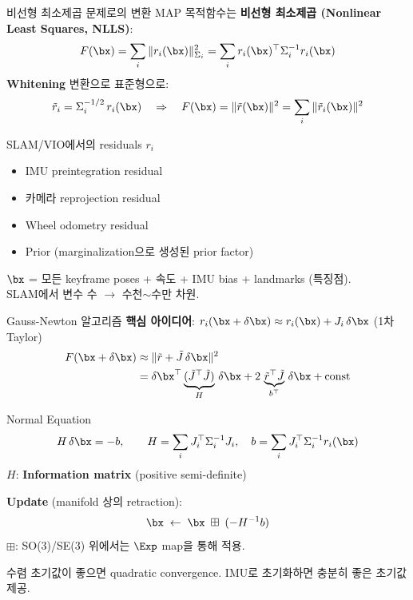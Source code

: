 \begin{frame}{비선형 최소제곱 문제로의 변환}
  MAP 목적함수는 \textbf{비선형 최소제곱 (Nonlinear Least Squares, NLLS)}:
  \[
    F(\bx) = \sum_i \|r_i(\bx)\|_{\Sigma_i}^2
           = \sum_i r_i(\bx)^\top \Sigma_i^{-1} r_i(\bx)
  \]
  \pause
  \textbf{Whitening} 변환으로 표준형으로:
  \[
    \tilde{r}_i = \Sigma_i^{-1/2}\,r_i(\bx)
    \quad\Rightarrow\quad
    F(\bx) = \|\tilde{r}(\bx)\|^2 = \sum_i \|\tilde{r}_i(\bx)\|^2
  \]
  \pause
  \begin{block}{SLAM/VIO에서의 residuals $r_i$}
    \begin{itemize}
      \item IMU preintegration residual
      \item 카메라 reprojection residual
      \item Wheel odometry residual
      \item Prior (marginalization으로 생성된 prior factor)
    \end{itemize}
  \end{block}
  \pause
  $\bx$ = 모든 keyframe poses + 속도 + IMU bias + landmarks (특징점).\\
  SLAM에서 변수 수 $\to$ 수천$\sim$수만 차원.
\end{frame}

\begin{frame}{Gauss-Newton 알고리즘}
  \textbf{핵심 아이디어}: $r_i(\bx + \delta\bx) \approx r_i(\bx) + J_i\,\delta\bx$ (1차 Taylor)
  \pause
  \begin{align*}
    F(\bx + \delta\bx)
    &\approx \|\tilde{r} + \tilde{J}\,\delta\bx\|^2 \\
    &= \delta\bx^\top \underbrace{(\tilde{J}^\top\tilde{J})}_{H}\,\delta\bx
       + 2\,\underbrace{\tilde{r}^\top\tilde{J}}_{b^\top}\,\delta\bx + \text{const}
  \end{align*}
  \pause
  \begin{block}{Normal Equation}
    \[
      H\,\delta\bx = -b,
      \qquad
      H = \sum_i J_i^\top \Sigma_i^{-1} J_i,
      \quad
      b = \sum_i J_i^\top \Sigma_i^{-1} r_i(\bx)
    \]
    $H$: \textbf{Information matrix} (positive semi-definite)
  \end{block}
  \pause
  \textbf{Update} (manifold 상의 retraction):
  \[
    \bx \;\leftarrow\; \bx \;\boxplus\; (-H^{-1}b)
  \]
  $\boxplus$: SO(3)/SE(3) 위에서는 $\Exp$ map을 통해 적용.\\[0.3em]
  \begin{exampleblock}{수렴}
    초기값이 좋으면 quadratic convergence. IMU로 초기화하면 충분히 좋은 초기값 제공.
  \end{exampleblock}
\end{frame}

